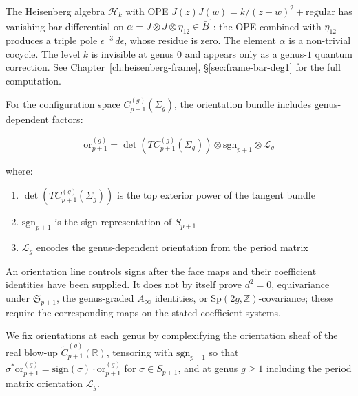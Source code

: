 \begin{example}\label{ex:heisenberg-d-deg1}
\label{ex:free-boson-d-deg1}
The Heisenberg algebra $\mathcal{H}_k$ with OPE $J(z)J(w) = k/(z-w)^2 + \text{regular}$ has
vanishing bar differential on $\alpha = J \otimes J \otimes \eta_{12} \in \bar{B}^1$: the OPE combined with $\eta_{12}$ produces a triple pole $\epsilon^{-3}\,d\epsilon$, whose residue is zero.  The element $\alpha$ is a non-trivial cocycle.  The level $k$ is invisible at genus $0$ and appears only as a genus-$1$ quantum correction.  See Chapter~\ref{ch:heisenberg-frame}, \S\ref{sec:frame-bar-deg1} for the full computation.
\end{example}

\begin{definition}
For the configuration space $C_{p+1}^{(g)}(\Sigma_g)$, the orientation bundle includes genus-dependent factors:

\[\text{or}_{p+1}^{(g)} = \det(TC_{p+1}^{(g)}(\Sigma_g)) \otimes \text{sgn}_{p+1} \otimes \mathcal{L}_g\]

where:
\begin{enumerate}
\item $\det(TC_{p+1}^{(g)}(\Sigma_g))$ is the top exterior power of the tangent bundle
\item $\text{sgn}_{p+1}$ is the sign representation of $S_{p+1}$
\item $\mathcal{L}_g$ encodes the genus-dependent orientation from the period matrix
\end{enumerate}

An orientation line controls signs after the face maps and their coefficient identities have been supplied.  It does not by itself prove $d^2=0$, equivariance under $\mathfrak{S}_{p+1}$, the genus-graded $A_\infty$ identities, or $\text{Sp}(2g,\mathbb Z)$-covariance; these require the corresponding maps on the stated coefficient systems.
\end{definition}

\begin{remark}
We fix orientations at each genus by complexifying the orientation sheaf of the real blow-up $\widetilde{C}_{p+1}^{(g)}(\mathbb{R})$, tensoring with $\text{sgn}_{p+1}$ so that $\sigma^* \text{or}_{p+1}^{(g)} = \text{sign}(\sigma) \cdot \text{or}_{p+1}^{(g)}$ for $\sigma \in S_{p+1}$, and at genus $g \geq 1$ including the period matrix orientation $\mathcal{L}_g$.
\end{remark}

